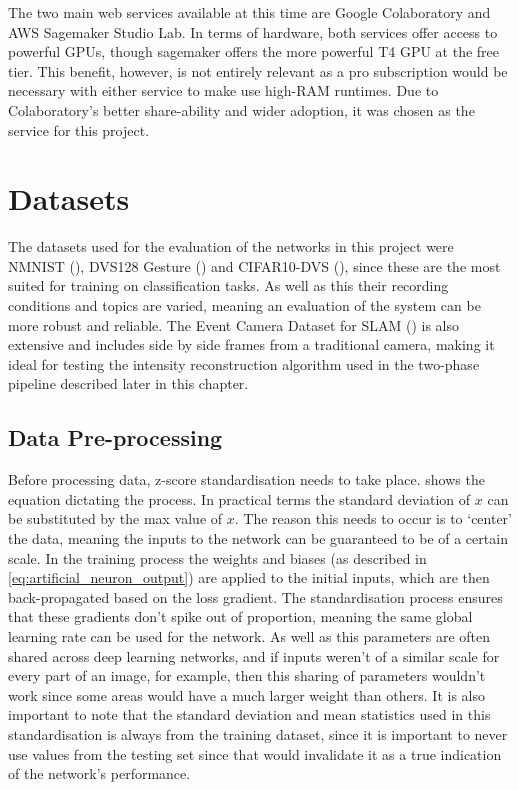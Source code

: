 The two main web services available at this time are Google Colaboratory\cite{GoogleColab} and AWS Sagemaker Studio Lab\cite{AwsSagemaker}. In terms of hardware, both services offer access to powerful GPUs, though sagemaker offers the more powerful T4 GPU at the free tier. This benefit, however, is not entirely relevant as a pro subscription would be necessary with either service to make use high-RAM runtimes. Due to Colaboratory's better share-ability and wider adoption, it was chosen as the service for this project.

\section{Datasets}

The datasets used for the evaluation of the networks in this project were NMNIST (), DVS128 Gesture () and CIFAR10-DVS (), since these are the most suited for training on classification tasks. As well as this their recording conditions and topics are varied, meaning an evaluation of the system can be more robust and reliable. The Event Camera Dataset for SLAM () is also extensive and includes side by side frames from a traditional camera, making it ideal for testing the intensity reconstruction algorithm used in the two-phase pipeline described later in this chapter.

\subsection{Data Pre-processing} \label{ssec:data_preprocessing_design}

Before processing data, z-score standardisation needs to take place.  shows the equation dictating the process. In practical terms the standard deviation of $ x $ can be substituted by the max value of $ x $. The reason this needs to occur is to `center' the data, meaning the inputs to the network can be guaranteed to be of a certain scale. In the training process the weights and biases (as described in \cref{eq:artificial_neuron_output}) are applied to the initial inputs, which are then back-propagated based on the loss gradient. The standardisation process ensures that these gradients don't spike out of proportion, meaning the same global learning rate can be used for the network. As well as this parameters are often shared across deep learning networks, and if inputs weren't of a similar scale for every part of an image, for example, then this sharing of parameters wouldn't work since some areas would have a much larger weight than others. It is also important to note that the standard deviation and mean statistics used in this standardisation is always from the training dataset, since it is important to never use values from the testing set since that would invalidate it as a true indication of the network's performance.

